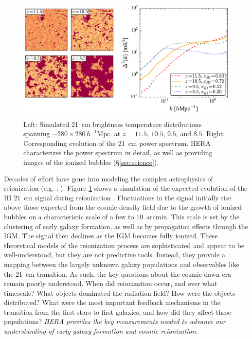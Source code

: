 \documentclass[preprint]{aastex}
\newcommand{\Mycitep}[1]{{\bf \citep{#1}}}
\newcommand{\Mycitealt}[1]{{\bf \citealt{#1}}}
\newcommand{\Caption}[4]{\vspace{#1}\renewcommand{\baselinestretch}{#2}\caption{#4}\vspace{#3}}
\begin{document}
\begin{figure}[t]\centering
\includegraphics[height=2.5in]{plots/cubes/cubesAndPspecs.pdf}
\Caption{-0.2in}{0.9}{-0.1in}{\small 
Left: Simulated 21~cm brightness temperature distributions spanning $\sim 280 \times 280\,h^{-1}\textrm{Mpc}$.
at $z=11.5$, $10.5$, $9.5$, and $8.5$.
Right: Corresponding evolution of the 21~cm power spectrum.  HERA
characterizes the power spectrum in detail, as well as
providing images of the ionized bubbles (\S\ref{sec:science}).}
\label{fig:EoRsims} \end{figure}

Decades of effort have gone into modeling the complex astrophysics of reionization
(e.g. \citealt{shapiro_giroux1987, haiman_loeb1997}; \Mycitealt{furlanetto_et_al2004, santos_et_al2010}). Figure \ref{fig:EoRsims} shows a 
simulation of the expected evolution of the HI 21~cm signal during reionization \Mycitep{mesinger_furlanetto2007}. Fluctuations in the signal initially 
rise above those expected from the cosmic density field due to the growth of ionized bubbles on a characteristic 
scale of a few to 10~arcmin. This scale is set by the clustering of early galaxy formation, as well as by 
propagation effects through the IGM. The signal then declines as the IGM becomes fully ionized.  These theoretical 
models of the reionization process are sophisticated and appear to be well-understood, but they are not 
predictive tools. Instead, they provide a mapping between the largely unknown galaxy populations and observables 
like the 21~cm transition. As such, the key questions about the cosmic dawn era remain poorly understood.  When 
did reionization occur, and over what timescale?  What objects dominated the radiation field?  How were the 
objects distributed?  What were the most important feedback mechanisms in the transition from the first stars to
first galaxies, and how did they affect these populations?  {\it HERA provides the key measurements needed 
to advance our understanding of early galaxy formation and cosmic reionization.}
\end{document}
